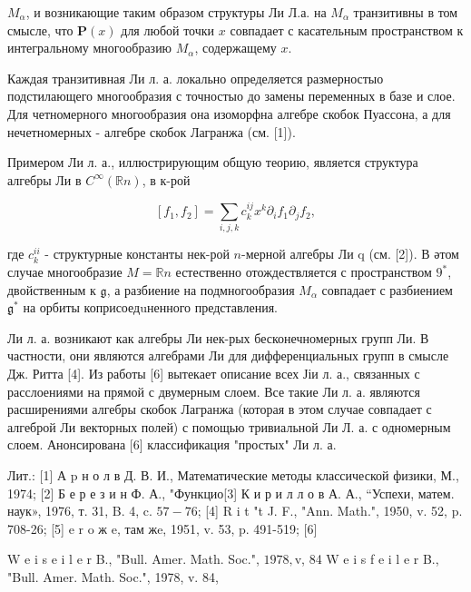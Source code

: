 \documentclass[10pt]{article}
\begin{document}
$M_{\alpha}$, и возникающие таким образом структуры Ли Л.а. на $M_{\alpha}$ транзитивны в том смысле, что $\boldsymbol{P}(x)$ для любой точки $x$ совпадает с касательным пространством к интегральному многообразию $M_{\alpha}$, содержащему $x$.



Каждая транзитивная Ли л. а. локально определяется размерностыо подстилающего многообразия с точностыо до замены переменных в базе и слое. Для четномерного многообразия она изоморфна алгебре скобок Пуассона, а для нечетномерных - алгебре скобок Лагранжа (см. [1]).



Примером Ли л. а., иллюстрирующим общую теорию, является структура алгебры Ли в $C^{\infty}(\mathbb{R} n)$, в к-рой



\[

\left[f_{1}, f_{2}\right]=\sum_{i, j, k} c_{k}^{i j} x^{k} \partial_{i} f_{1} \partial_{j} f_{2},

\]



где $c_{k}^{i i}$ - структурные константы нек-рой $n$-мерной алгебры Ли q (см. [2]). В әтом случае многообразие $M=\mathbb{R} n$ естественно отождествляется с пространством $9^{*}$, двойственным к $\mathfrak{g}$, а разбиение на подмногообразия $M_{\alpha}$ совпадает с разбиением $\mathfrak{g}^{*}$ на орбиты коприсоедuненного представления.



Ли л. а. возникают как алгебры Ли нек-рых бесконечномерных групп Ли. В частности, они являются алгебрами Ли для дифференциальных групп в смысле Дж. Ритта [4]. Из работы [6] вытекает описание всех Јіи л. а., связанных с расслоениями на прямой с двумерным слоем. Все такие Ли л. а. являются расширениями алгебры скобок Лагранжа (которая в этом случае совпадает с алгеброй Ли векторных полей) с помощью тривиальной Ли Л. а. с одномерным слоем. Анонсирована [6] классификация "простых" Ли л. а.



Лит.: [1] А p н о л в Д. В. И., Математические методы классической физики, М., 1974; [2] Б е р е з и н Ф. А., "Функцио[3] К и р и л л о в А. А., “Успехи, матем. наук», 1976, т. 31, B. 4, c. $57-76$; [4] R i t "t J. F., "Ann. Math.", 1950, v. 52, p. 708-26; [5] e r o ж e, там жe, 1951, v. 53, p. 491-519; [6]

$\mathrm{W}$ e i s e i l e r B., "Bull. Amer. Math. Soc.", $1978, \mathrm{v}$, 84 W e i s f e i l e r B., "Bull. Amer. Math. Soc.", 1978, v. 84,
\end{document}
